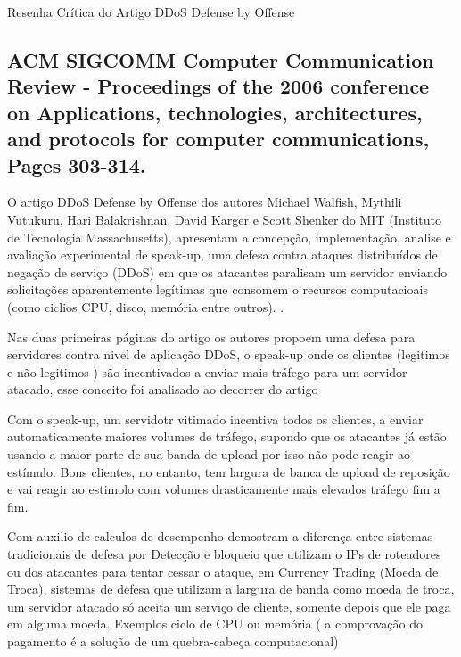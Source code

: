 \documentclass[a4paper,12pt]{article}
\begin{document}
\LARGE
Resenha Crítica do Artigo DDoS Defense by Offense
\large

\subsection*{\textbf{ACM SIGCOMM } Computer Communication Review - Proceedings of the 2006 conference on Applications, technologies, architectures, and protocols for computer communications, Pages 303-314. }

O artigo DDoS Defense by Offense \cite{Walfish:2006:DDO:1151659.1159948} dos autores Michael Walfish, Mythili Vutukuru, Hari Balakrishnan, David Karger  e  Scott Shenker do MIT (Instituto de Tecnologia Massachusetts), apresentam a concepção, implementação, analise e avaliação experimental de speak-up, uma defesa contra ataques distribuídos de negação de serviço (DDoS) em que os atacantes paralisam um servidor enviando solicitações aparentemente legítimas que consomem o recursos computacioais (como ciclios CPU, disco, memória entre outros).
.

\vspace{0.5cm}

Nas duas primeiras páginas do artigo os autores propoem uma defesa para servidores contra nivel de aplicação DDoS, o speak-up onde os clientes (legitimos e não legitimos ) são incentivados a enviar mais tráfego para um servidor atacado, esse conceito foi analisado ao decorrer do artigo

\vspace{0.5cm}
Com o speak-up, um servidotr vitimado incentiva todos os clientes, a  enviar automaticamente maiores volumes de tráfego, supondo que os atacantes já estão usando a maior parte de sua banda de upload por isso não pode reagir ao estímulo. Bons clientes, no entanto, tem largura de banca de upload de reposição e vai reagir ao estimolo com volumes drasticamente mais elevados tráfego fim a fim.
\vspace{0.5cm}

Com auxilio de calculos de desempenho demostram  a diferença entre  sistemas tradicionais de defesa por Detecção e bloqueio que utilizam o IPs de roteadores ou dos atacantes  para tentar cessar o ataque,  em  Currency Trading (Moeda de Troca),  sistemas de defesa que utilizam a largura de banda como moeda de troca,  um servidor atacado só aceita um serviço de cliente, somente depois que ele paga em alguma moeda. Exemplos ciclo de  CPU ou memória ( a comprovação do pagamento é a solução de um quebra-cabeça computacional)
\vspace{0.5cm}
\end{document}
